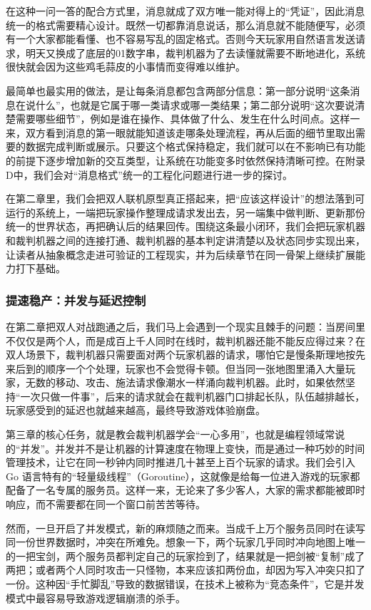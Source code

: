 在这种一问一答的配合方式里，消息就成了双方唯一能对得上的“凭证”，因此消息统一的格式需要精心设计。既然一切都靠消息说话，那么消息就不能随便写，必须有一个大家都能看懂、也不容易写乱的固定格式。否则今天玩家用自然语言发送请求，明天又换成了底层的01数字串，裁判机器为了去读懂就需要不断地进化，系统很快就会因为这些鸡毛蒜皮的小事情而变得难以维护。

最简单也最实用的做法，是让每条消息都包含两部分信息：第一部分说明“这条消息在说什么”，也就是它属于哪一类请求或哪一类结果；第二部分说明“这次要说清楚需要哪些细节”，例如是谁在操作、具体做了什么、发生在什么时间点。这样一来，双方看到消息的第一眼就能知道该走哪条处理流程，再从后面的细节里取出需要的数据完成判断或展示。只要这个格式保持稳定，我们就可以在不影响已有功能的前提下逐步增加新的交互类型，让系统在功能变多时依然保持清晰可控。在附录D中，我们会对“消息格式”统一的工程化问题进行进一步的探讨。

在第二章里，我们会把双人联机原型真正搭起来，把“应该这样设计”的想法落到可运行的系统上，一端把玩家操作整理成请求发出去，另一端集中做判断、更新那份统一的世界状态，再把确认后的结果回传。围绕这条最小闭环，我们会把玩家机器和裁判机器之间的连接打通、裁判机器的基本判定讲清楚以及状态同步实现出来，让读者从抽象概念走进可验证的工程现实，并为后续章节在同一骨架上继续扩展能力打下基础。

\subsubsection{提速稳产：并发与延迟控制}\label{sec:并发与延迟控制}
在第二章把双人对战跑通之后，我们马上会遇到一个现实且棘手的问题：当房间里不仅仅是两个人，而是成百上千人同时在线时，裁判机器还能不能反应得过来？在双人场景下，裁判机器只需要面对两个玩家机器的请求，哪怕它是慢条斯理地按先来后到的顺序一个个处理，玩家也不会觉得卡顿。但当同一张地图里涌入大量玩家，无数的移动、攻击、施法请求像潮水一样涌向裁判机器。此时，如果依然坚持“一次只做一件事”，后来的请求就会在裁判机器门口排起长队，队伍越排越长，玩家感受到的延迟也就越来越高，最终导致游戏体验崩盘。

第三章的核心任务，就是教会裁判机器学会“一心多用”，也就是编程领域常说的“并发”。并发并不是让机器的计算速度在物理上变快，而是通过一种巧妙的时间管理技术，让它在同一秒钟内同时推进几十甚至上百个玩家的请求。我们会引入 Go 语言特有的“轻量级线程”（Goroutine），这就像是给每一位进入游戏的玩家都配备了一名专属的服务员。这样一来，无论来了多少客人，大家的需求都能被即时响应，而不需要都在同一个窗口前苦苦等待。

然而，一旦开启了并发模式，新的麻烦随之而来。当成千上万个服务员同时在读写同一份世界数据时，冲突在所难免。想象一下，两个玩家几乎同时冲向地图上唯一的一把宝剑，两个服务员都判定自己的玩家捡到了，结果就是一把剑被“复制”成了两把；或者两个人同时攻击一只怪物，本来应该扣两份血，却因为写入冲突只扣了一份。这种因“手忙脚乱”导致的数据错误，在技术上被称为“竞态条件”，它是并发模式中最容易导致游戏逻辑崩溃的杀手。

